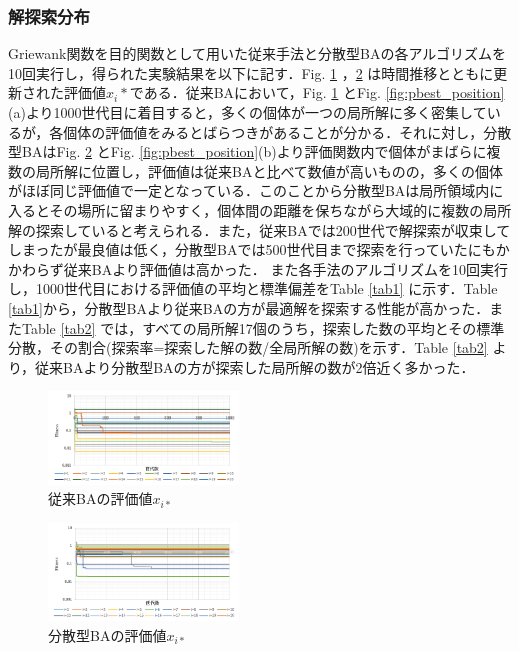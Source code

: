 \documentclass{jarticle}
\begin{document}
\subsubsection{解探索分布}
Griewank関数を目的関数として用いた従来手法と分散型BAの各アルゴリズムを10回実行し，得られた実験結果を以下に記す．Fig. \ref{fig:o_pbest} ，\ref{fig:s_pbest} は時間推移とともに更新された評価値${x_i*}$である．従来BAにおいて，Fig. \ref{fig:o_pbest} とFig. \ref{fig:pbest_position}(a)より1000世代目に着目すると，多くの個体が一つの局所解に多く密集しているが，各個体の評価値をみるとばらつきがあることが分かる．それに対し，分散型BAはFig. \ref{fig:s_pbest} とFig. \ref{fig:pbest_position}(b)より評価関数内で個体がまばらに複数の局所解に位置し，評価値は従来BAと比べて数値が高いものの，多くの個体がほぼ同じ評価値で一定となっている．このことから分散型BAは局所領域内に入るとその場所に留まりやすく，個体間の距離を保ちながら大域的に複数の局所解の探索していると考えられる．また，従来BAでは200世代で解探索が収束してしまったが最良値は低く，分散型BAでは500世代目まで探索を行っていたにもかかわらず従来BAより評価値は高かった．
また各手法のアルゴリズムを10回実行し，1000世代目における評価値の平均と標準偏差をTable \ref{tab1} に示す．Table \ref{tab1}から，分散型BAより従来BAの方が最適解を探索する性能が高かった．またTable \ref{tab2} では，すべての局所解17個のうち，探索した数の平均とその標準分散，その割合(探索率=探索した解の数/全局所解の数)を示す．Table \ref{tab2} より，従来BAより分散型BAの方が探索した局所解の数が2倍近く多かった．

\begin{figure}[h]
\begin{center}
\includegraphics[width=0.45\textwidth]{o_pbest.bmp}
\caption{従来BAの評価値${x_{i*}}$}
\label{fig:o_pbest}
\end{center}
\end{figure}

\begin{figure}[h]
\begin{center}
\includegraphics[width=0.45\textwidth]{s_pbest.bmp}
\caption{分散型BAの評価値${x_{i*}}$}
\label{fig:s_pbest}
\end{center}
\end{figure}
\end{document}
